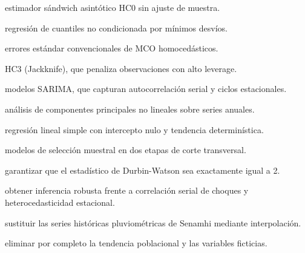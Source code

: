 \begin{opts}
    \item estimador sándwich asintótico HC0 sin ajuste de muestra.
    \item regresión de cuantiles no condicionada por mínimos desvíos.
    \item errores estándar convencionales de MCO homocedásticos.
    \item HC3 (Jackknife), que penaliza observaciones con alto leverage.
\end{opts}

\begin{opts}
    \item modelos SARIMA, que capturan autocorrelación serial y ciclos estacionales.
    \item análisis de componentes principales no lineales sobre series anuales.
    \item regresión lineal simple con intercepto nulo y tendencia determinística.
    \item modelos de selección muestral en dos etapas de corte transversal.
\end{opts}

\begin{opts}
    \item garantizar que el estadístico de Durbin-Watson sea exactamente igual a 2.
    \item obtener inferencia robusta frente a correlación serial de choques y heterocedasticidad estacional.
    \item sustituir las series históricas pluviométricas de Senamhi mediante interpolación.
    \item eliminar por completo la tendencia poblacional y las variables ficticias.
\end{opts}

